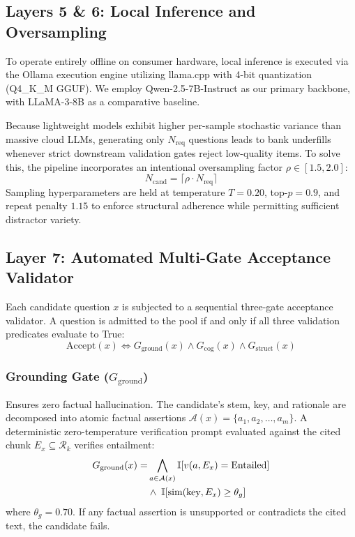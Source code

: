 \documentclass[conference]{IEEEtran}
\begin{document}
\subsection{Layers 5 \& 6: Local Inference and Oversampling}
To operate entirely offline on consumer hardware, local inference is executed via the Ollama execution engine utilizing llama.cpp with 4-bit quantization (Q4\_K\_M GGUF). We employ Qwen-2.5-7B-Instruct as our primary backbone, with LLaMA-3-8B as a comparative baseline.

Because lightweight models exhibit higher per-sample stochastic variance than massive cloud LLMs, generating only $N_{\text{req}}$ questions leads to bank underfills whenever strict downstream validation gates reject low-quality items. To solve this, the pipeline incorporates an intentional oversampling factor $\rho \in [1.5, 2.0]$:
\begin{equation}
N_{\text{cand}} = \lceil \rho \cdot N_{\text{req}} \rceil
\end{equation}
Sampling hyperparameters are held at temperature $T = 0.20$, top-$p = 0.9$, and repeat penalty $1.15$ to enforce structural adherence while permitting sufficient distractor variety.

\subsection{Layer 7: Automated Multi-Gate Acceptance Validator}
Each candidate question $x$ is subjected to a sequential three-gate acceptance validator. A question is admitted to the pool if and only if all three validation predicates evaluate to True:
\begin{equation}
\text{Accept}(x) \iff G_{\text{ground}}(x) \land G_{\text{cog}}(x) \land G_{\text{struct}}(x)
\end{equation}

\subsubsection{Grounding Gate ($G_{\text{ground}}$)}
Ensures zero factual hallucination. The candidate's stem, key, and rationale are decomposed into atomic factual assertions $\mathcal{A}(x) = \{a_1, a_2, \dots, a_m\}$. A deterministic zero-temperature verification prompt evaluated against the cited chunk $E_x \subseteq \mathcal{R}_k$ verifies entailment:
\begin{align}
G_{\text{ground}}(x) = &\bigwedge_{a \in \mathcal{A}(x)} \mathbb{I}[v(a, E_x) = \text{Entailed}] \notag \\
&\land\; \mathbb{I}[\text{sim}(\text{key}, E_x) \ge \theta_g]
\end{align}
where $\theta_g = 0.70$. If any factual assertion is unsupported or contradicts the cited text, the candidate fails.
\end{document}
